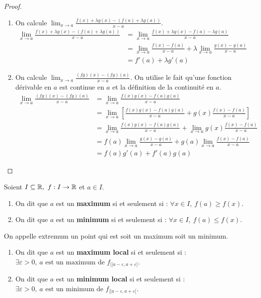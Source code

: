 \begin{proof}
	\leavevmode
	\begin{enumerate}
		\item On calcule $\lim_{x \to a} \frac{f(x) + \lambda g(x) - (f(a) + \lambda g(a))}{x - a}$.
		\begin{align*}
			\lim_{x \to a} \frac{f(x) + \lambda g(x) - (f(a) + \lambda g(a))}{x - a} &= \lim_{x \to a} \frac{f(x) + \lambda g(x) - f(a) - \lambda g(a)}{x - a} \\
			&= \lim_{x \to a} \frac{f(x) - f(a)}{x - a} + \lambda \lim_{x \to a} \frac{g(x) - g(a)}{x - a} \\
			&= f'(a) + \lambda g'(a)
		\end{align*}
		\item On calcule $\lim_{x \to a} \frac{(fg)(x) - (fg)(a)}{x - a}$. On utilise le fait qu'une fonction dérivable en $a$ est continue en $a$ et la définition de la continuité en $a$.
		\begin{align*}
			\lim_{x \to a} \frac{(fg)(x) - (fg)(a)}{x - a} &= \lim_{x \to a} \frac{f(x) g(x) - f(a) g(a)}{x - a} \\
			&= \lim_{x \to a} \left[ \frac{f(x) g(x) - f(a) g(a)}{x - a} + g(x) \frac{f(x) - f(a)}{x - a} \right] \\
			&= \lim_{x \to a} \frac{f(x)g(x) - f(a)g(a)}{x - a} + \lim_{x \to a} g(x) \frac{f(x) - f(a)}{x - a} \\
			&= f(a) \lim_{x \to a} \frac{g(x) - g(a)}{x - a} + g(a) \lim_{x \to a} \frac{f(x) - f(a)}{x - a} \\
			&= f(a) g'(a) + f'(a) g(a)
		\end{align*}
	\end{enumerate}
\end{proof}

\begin{definition}
    Soient $I \subseteq \mathbb{R},\ f : I \to \mathbb{R}$ et $a \in I$.
    \begin{enumerate}
        \item On dit que $a$ est un \textbf{maximum} si et seulement si : $\forall x \in I,\ f(a) \geq f(x)$.
        \item On dit que $a$ est un \textbf{minimum} si et seulement si : $\forall x \in I,\ f(a) \leq f(x)$.
    \end{enumerate}
    On appelle extremum un point qui est soit un maximum soit un minimum.
    \begin{enumerate}
        \item On dit que $a$ est un \textbf{maximum local} si et seulement si : $\exists \varepsilon > 0,\ a \text{ est un maximum de } f_{|]a - \varepsilon, a + \varepsilon[}$.
        \item On dit que $a$ est un \textbf{minimum local} si et seulement si : $\exists \varepsilon > 0,\ a \text{ est un minimum de } f_{|]a - \varepsilon, a + \varepsilon[}$.
    \end{enumerate}
\end{definition}

